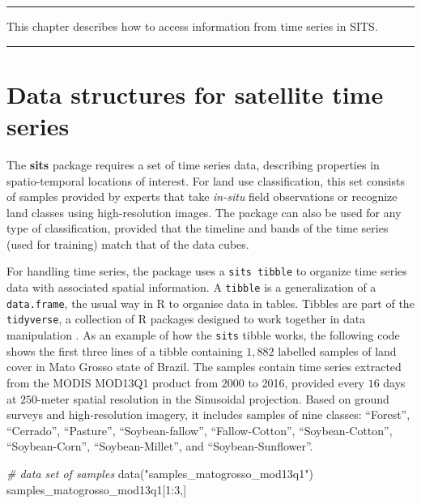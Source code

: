 \documentclass[a4paper,]{tufte-book}
\newenvironment{Shaded}{}{}
\newcommand{\CommentTok}[1]{\textcolor[rgb]{0.38,0.63,0.69}{\textit{#1}}}
\newcommand{\DecValTok}[1]{\textcolor[rgb]{0.25,0.63,0.44}{#1}}
\newcommand{\FunctionTok}[1]{\textcolor[rgb]{0.02,0.16,0.49}{#1}}
\newcommand{\NormalTok}[1]{#1}
\newcommand{\SpecialCharTok}[1]{\textcolor[rgb]{0.25,0.44,0.63}{#1}}
\newcommand{\StringTok}[1]{\textcolor[rgb]{0.25,0.44,0.63}{#1}}
\begin{document}
\begin{center}\rule{0.5\linewidth}{0.5pt}\end{center}

This chapter describes how to access information from time series in SITS.

\begin{center}\rule{0.5\linewidth}{0.5pt}\end{center}

\hypertarget{data-structures-for-satellite-time-series}{%
\section{Data structures for satellite time series}\label{data-structures-for-satellite-time-series}}

The \textbf{sits} package requires a set of time series data, describing properties in spatio-temporal locations of interest. For land use classification, this set consists of samples provided by experts that take \emph{in-situ} field observations or recognize land classes using high-resolution images. The package can also be used for any type of classification, provided that the timeline and bands of the time series (used for training) match that of the data cubes.

For handling time series, the package uses a \texttt{sits\ tibble} to organize time series data with associated spatial information. A \texttt{tibble} is a generalization of a \texttt{data.frame}, the usual way in R to organise data in tables. Tibbles are part of the \texttt{tidyverse}, a collection of R packages designed to work together in data manipulation \citep{Wickham2017}. As an example of how the \texttt{sits} tibble works, the following code shows the first three lines of a tibble containing \(1,882\) labelled samples of land cover in Mato Grosso state of Brazil. The samples contain time series extracted from the MODIS MOD13Q1 product from 2000 to 2016, provided every \(16\) days at \(250\)-meter spatial resolution in the Sinusoidal projection. Based on ground surveys and high-resolution imagery, it includes samples of nine classes: ``Forest'', ``Cerrado'', ``Pasture'', ``Soybean-fallow'', ``Fallow-Cotton'', ``Soybean-Cotton'', ``Soybean-Corn'', ``Soybean-Millet'', and ``Soybean-Sunflower''.

\begin{Shaded}
\begin{Highlighting}[]
\CommentTok{\# data set of samples}
\FunctionTok{data}\NormalTok{(}\StringTok{"samples\_matogrosso\_mod13q1"}\NormalTok{)}
\NormalTok{samples\_matogrosso\_mod13q1[}\DecValTok{1}\SpecialCharTok{:}\DecValTok{3}\NormalTok{,]}
\end{Highlighting}
\end{Shaded}
\end{document}

